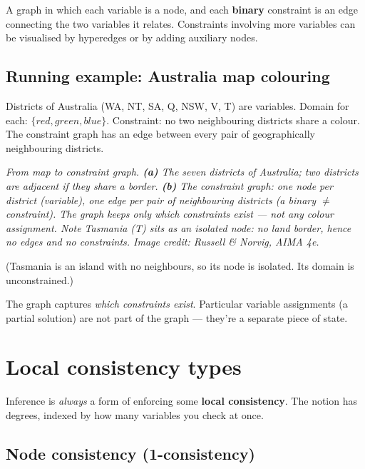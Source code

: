 \documentclass[11pt, a4paper]{article}
\begin{document}
\begin{defbox}
A graph in which each variable is a node, and each \textbf{binary} constraint is an edge connecting the two variables it relates. Constraints involving more variables can be visualised by hyperedges or by adding auxiliary nodes.
\end{defbox}

\subsection{Running example: Australia map colouring}

Districts of Australia (WA, NT, SA, Q, NSW, V, T) are variables. Domain for each: $\{red, green, blue\}$. Constraint: no two neighbouring districts share a colour. The constraint graph has an edge between every pair of geographically neighbouring districts.

\begin{center}

\footnotesize\textit{From map to constraint graph. \textbf{(a)} The seven districts of Australia; two districts are adjacent if they share a border. \textbf{(b)} The constraint graph: one node per district (variable), one edge per pair of \emph{neighbouring} districts (a binary $\neq$ constraint). The graph keeps only \emph{which} constraints exist --- not any colour assignment. Note Tasmania (T) sits as an isolated node: no land border, hence no edges and no constraints. Image credit: Russell \& Norvig, AIMA 4e.}
\end{center}

(Tasmania is an island with no neighbours, so its node is isolated. Its domain is unconstrained.)

The graph captures \emph{which constraints exist}. Particular variable assignments (a partial solution) are not part of the graph — they're a separate piece of state.

\section{Local consistency types}

Inference is \emph{always} a form of enforcing some \textbf{local consistency}. The notion has degrees, indexed by how many variables you check at once.

\subsection{Node consistency (1-consistency)}
\end{document}
